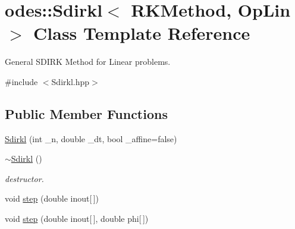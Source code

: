 \hypertarget{classodes_1_1Sdirkl}{\section{odes\-:\-:Sdirkl$<$ R\-K\-Method, Op\-Lin $>$ Class Template Reference}
\label{classodes_1_1Sdirkl}
}


General S\-D\-I\-R\-K Method for Linear problems.  




{\ttfamily \#include $<$Sdirkl.\-hpp$>$}

\subsection*{Public Member Functions}
\begin{DoxyCompactItemize}
\item 
\hyperlink{classodes_1_1Sdirkl_ab5272f354fc9a8ea4c212dc84581720f}{Sdirkl} (int \-\_\-n, double \-\_\-dt, bool \-\_\-affine=false)
\item 
\hyperlink{classodes_1_1Sdirkl_a1dcc547098b06e187faced547fe8c0aa}{$\sim$\-Sdirkl} ()
\begin{DoxyCompactList}\small\item\em destructor. \end{DoxyCompactList}\item 
void \hyperlink{classodes_1_1Sdirkl_a026cd5c2fcff86939ccb8be69481fdbd}{step} (double inout\mbox{[}$\,$\mbox{]})
\item 
void \hyperlink{classodes_1_1Sdirkl_a44c0a6d3c038dc6b33bc7b0e80ae16e1}{step} (double inout\mbox{[}$\,$\mbox{]}, double phi\mbox{[}$\,$\mbox{]})
\end{DoxyCompactItemize}
